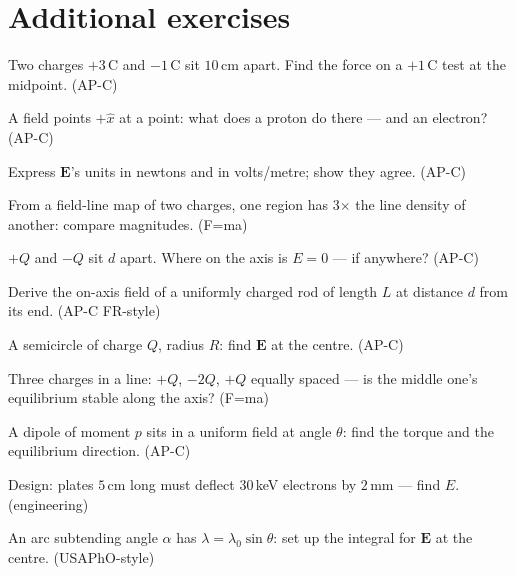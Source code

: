 \section*{Additional exercises}

\begin{exercise}[easy]
Two charges $+3$\,\textmu C and $-1$\,\textmu C sit $10$\,cm apart.
Find the force on a $+1$\,\textmu C test at the midpoint. (AP-C)
\end{exercise}
\begin{exercise}[easy]
A field points $+\hat x$ at a point: what does a proton do there ---
and an electron? (AP-C)
\end{exercise}
\begin{exercise}[easy]
Express $\mathbf E$'s units in newtons and in volts/metre; show they
agree. (AP-C)
\end{exercise}
\begin{exercise}[easy]
From a field-line map of two charges, one region has 3$\times$ the line
density of another: compare magnitudes. (F=ma)
\end{exercise}
\begin{exercise}[easy]
$+Q$ and $-Q$ sit $d$ apart. Where on the axis is $E=0$ --- if anywhere?
(AP-C)
\end{exercise}
\begin{exercise}[medium]
Derive the on-axis field of a uniformly charged rod of length $L$ at
distance $d$ from its end. (AP-C FR-style)
\end{exercise}
\begin{exercise}[medium]
A semicircle of charge $Q$, radius $R$: find $\mathbf E$ at the centre.
(AP-C)
\end{exercise}
\begin{exercise}[medium]
Three charges in a line: $+Q$, $-2Q$, $+Q$ equally spaced --- is the
middle one's equilibrium stable along the axis? (F=ma)
\end{exercise}
\begin{exercise}[medium]
A dipole of moment $p$ sits in a uniform field at angle $\theta$: find
the torque and the equilibrium direction. (AP-C)
\end{exercise}
\begin{exercise}[medium]
Design: plates $5$\,cm long must deflect $30$\,keV electrons by
$2$\,mm --- find $E$. (engineering)
\end{exercise}
\begin{exercise}[hard]
An arc subtending angle $\alpha$ has $\lambda=\lambda_0\sin\theta$:
set up the integral for $\mathbf E$ at the centre. (USAPhO-style)
\end{exercise}
